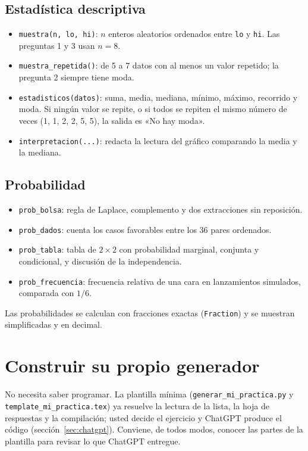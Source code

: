 \documentclass[11pt]{article}
\newcommand{\cod}[1]{\texttt{#1}}
\begin{document}
\subsection{Estadística descriptiva}
\begin{itemize}[leftmargin=*]
\item \cod{muestra(n, lo, hi)}: $n$ enteros aleatorios ordenados entre \cod{lo} y \cod{hi}. Las preguntas 1 y 3 usan $n=8$.
\item \cod{muestra\_repetida()}: de 5 a 7 datos con al menos un valor repetido; la pregunta 2 siempre tiene moda.
\item \cod{estadisticos(datos)}: suma, media, mediana, mínimo, máximo, recorrido y moda. Si ningún valor se repite, o si todos se repiten el mismo número de veces (1, 1, 2, 2, 5, 5), la salida es «No hay moda».
\item \cod{interpretacion(...)}: redacta la lectura del gráfico comparando la media y la mediana.
\end{itemize}

\subsection{Probabilidad}
\begin{itemize}[leftmargin=*]
\item \cod{prob\_bolsa}: regla de Laplace, complemento y dos extracciones sin reposición.
\item \cod{prob\_dados}: cuenta los casos favorables entre los 36 pares ordenados.
\item \cod{prob\_tabla}: tabla de $2\times2$ con probabilidad marginal, conjunta y condicional, y discusión de la independencia.
\item \cod{prob\_frecuencia}: frecuencia relativa de una cara en lanzamientos simulados, comparada con $1/6$.
\end{itemize}
Las probabilidades se calculan con fracciones exactas (\cod{Fraction}) y se muestran simplificadas y en decimal.

\section{Construir su propio generador}

No necesita saber programar. La plantilla mínima (\cod{generar\_mi\_practica.py} y \cod{template\_mi\_practica.tex}) ya resuelve la lectura de la lista, la hoja de respuestas y la compilación; usted decide el ejercicio y ChatGPT produce el código (sección~\ref{sec:chatgpt}). Conviene, de todos modos, conocer las partes de la plantilla para revisar lo que ChatGPT entregue.
\end{document}
